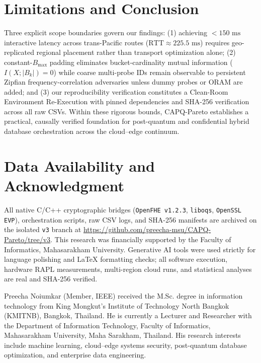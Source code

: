 \documentclass[10pt,journal,compsoc]{IEEEtran}
\begin{document}
\section{Limitations and Conclusion}\label{sec:conclusion}
Three explicit scope boundaries govern our findings: (1) achieving $<150\text{ ms}$ interactive latency across trans-Pacific routes ($\text{RTT} \approx 225.5\text{ ms}$) requires geo-replicated regional placement rather than transport optimization alone; (2) constant-$B_{\max}$ padding eliminates bucket-cardinality mutual information ($I(X;|B_k|)=0$) while coarse multi-probe IDs remain observable to persistent Zipfian frequency-correlation adversaries unless dummy probes or ORAM are added; and (3) our reproducibility verification constitutes a Clean-Room Environment Re-Execution with pinned dependencies and SHA-256 verification across all raw CSVs. Within these rigorous bounds, CAPQ-Pareto establishes a practical, causally verified foundation for post-quantum and confidential hybrid database orchestration across the cloud--edge continuum.

\section*{Data Availability and Acknowledgment}
All native C/C++ cryptographic bridges (\texttt{OpenFHE v1.2.3}, \texttt{liboqs}, \texttt{OpenSSL EVP}), orchestration scripts, raw CSV logs, and SHA-256 manifests are archived on the isolated \texttt{v3} branch at \url{https://github.com/preecha-msu/CAPQ-Pareto/tree/v3}. This research was financially supported by the Faculty of Informatics, Mahasarakham University. Generative AI tools were used strictly for language polishing and \LaTeX{} formatting checks; all software execution, hardware RAPL measurements, multi-region cloud runs, and statistical analyses are real and SHA-256 verified.




\begin{IEEEbiographynophoto}{Preecha Noiumkar}
(Member, IEEE) received the M.Sc. degree in information technology from King Mongkut's Institute of Technology North Bangkok (KMITNB), Bangkok, Thailand. He is currently a Lecturer and Researcher with the Department of Information Technology, Faculty of Informatics, Mahasarakham University, Maha Sarakham, Thailand. His research interests include machine learning, cloud--edge systems security, post-quantum database optimization, and enterprise data engineering.
\end{IEEEbiographynophoto}
\end{document}
